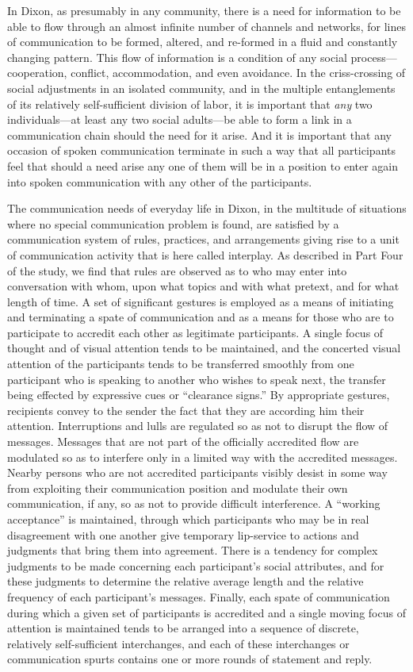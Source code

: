 \documentclass[openany,nobib]{tufte-book}
\begin{document}
In Dixon, as presumably in any community, there is a need for
information to be able to flow through an almost infinite number of
channels and networks, for lines of communication to be formed, altered,
and re-formed in a fluid and constantly changing pattern. This flow of
information is a condition of any social process---cooperation,
conflict, accommodation, and even avoidance. In the criss-crossing of
social adjustments in an isolated community, and in the multiple
entanglements of its relatively self-sufficient division of labor, it is
important that \emph{any} two individuals---at least any two social
adults---be able to form a link in a communication chain should the need
for it arise. And it is important that any occasion of spoken
communication terminate in such a way that all participants feel that
should a need arise any one of them will be in a position to enter again
into spoken communication with any other of the participants.

The communication needs of everyday life in Dixon, in the multitude of
situations where no special communication problem is found, are
satisfied by a communication system of rules, practices, and
arrangements giving rise to a unit of communication activity that is
here called interplay. As described in Part Four of the study, we find
that rules are observed as to who may enter into conversation with whom,
upon what topics and with what pretext, and for what length of time. A
set of significant gestures is employed as a means of initiating and
terminating a spate of communication and as a means for those who are to
participate to accredit each other as legitimate participants. A single
focus of thought and of visual attention tends to be maintained, and the
concerted visual attention of the participants tends to be transferred
smoothly from one participant who is speaking to another who wishes to
speak next, the transfer being effected by expressive cues or
``clearance signs.'' By appropriate gestures, recipients convey to the
sender the fact that they are according him their attention.
Interruptions and lulls are regulated so as not to disrupt the flow of
messages. Messages that are not part of the officially accredited flow
are modulated so as to interfere only in a limited way with the
accredited messages. Nearby persons who are not accredited participants
visibly desist in some way from exploiting their communication position
and modulate their own communication, if any, so as not to provide
difficult interference. A ``working acceptance'' is maintained, through
which participants who may be in real disagreement with one another give
temporary lip-service to actions and judgments that bring them into
agreement. There is a tendency for complex judgments to be made
concerning each participant's social attributes, and for these judgments
to determine the relative average length and the relative frequency of
each participant's messages. Finally, each spate of communication during
which a given set of participants is accredited and a single moving
focus of attention is maintained tends to be arranged into a sequence of
discrete, relatively self-sufficient interchanges, and each of these
interchanges or communication spurts contains one or more rounds of
statement and reply.
\end{document}
